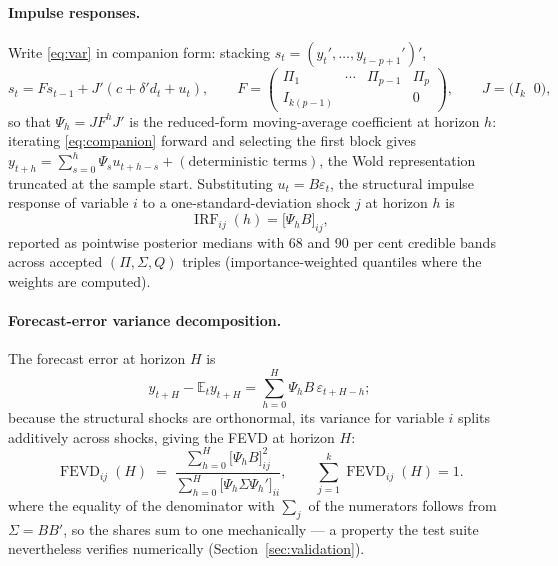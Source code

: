 \paragraph{Impulse responses.} Write \eqref{eq:var} in companion form: stacking $s_t = (y_t', \ldots, y_{t-p+1}')'$,
\begin{equation}
s_t = F s_{t-1} + J' (c + \delta' d_t + u_t), \qquad
F = \begin{pmatrix} \Pi_1 & \cdots & \Pi_{p-1} & \Pi_p \\ I_{k(p-1)} & & & 0 \end{pmatrix},
\qquad J = \big( I_k \;\; 0 \big),
\label{eq:companion}
\end{equation}
so that $\Psi_h = J F^h J'$ is the reduced-form moving-average coefficient at horizon $h$: iterating \eqref{eq:companion} forward and selecting the first block gives $y_{t+h} = \sum_{s=0}^{h} \Psi_s u_{t+h-s} + (\text{deterministic terms})$, the Wold representation truncated at the sample start. Substituting $u_t = B \varepsilon_t$, the structural impulse response of variable $i$ to a one-standard-deviation shock $j$ at horizon $h$ is
\begin{equation}
\operatorname{IRF}_{ij}(h) = \big[\Psi_h B\big]_{ij},
\end{equation}
reported as pointwise posterior medians with 68 and 90 per cent credible bands across accepted $(\Pi,\Sigma,Q)$ triples (importance-weighted quantiles where the weights are computed).

\paragraph{Forecast-error variance decomposition.} The forecast error at horizon $H$ is
\begin{equation*}
y_{t+H} - \mathbb{E}_t y_{t+H} = \sum_{h=0}^{H} \Psi_h B\, \varepsilon_{t+H-h};
\end{equation*}
because the structural shocks are orthonormal, its variance for variable $i$ splits additively across shocks, giving the FEVD at horizon $H$:
\begin{equation}
\operatorname{FEVD}_{ij}(H) \;=\;
\frac{\sum_{h=0}^{H}\big[\Psi_h B\big]_{ij}^{2}}
     {\sum_{h=0}^{H}\big[\Psi_h \Sigma \Psi_h'\big]_{ii}},
\qquad \sum_{j=1}^{k}\operatorname{FEVD}_{ij}(H) = 1 .
\label{eq:fevd}
\end{equation}
where the equality of the denominator with $\sum_j$ of the numerators follows from $\Sigma = BB'$, so the shares sum to one mechanically --- a property the test suite nevertheless verifies numerically (Section~\ref{sec:validation}).

